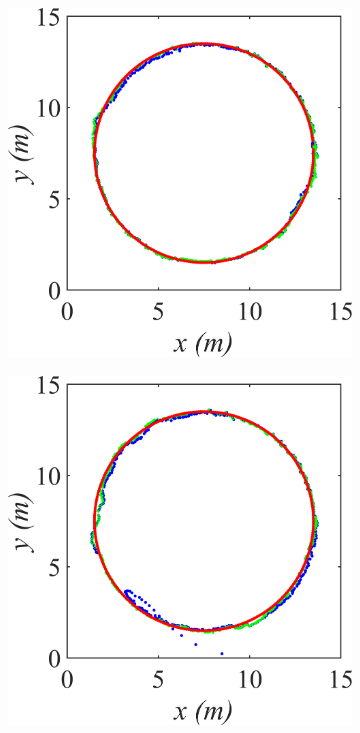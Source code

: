 \begin{figure}
    \centering
    \begin{subfigure}[tb]{0.2\textwidth}
        \includegraphics[width=\textwidth]{img/KL_0_5.png}
        \caption{}
    \end{subfigure}
    \begin{subfigure}[tb]{0.2\textwidth}
        \includegraphics[width=\textwidth]{img/KL_1.png}

\end{subfigure}
\end{figure}
